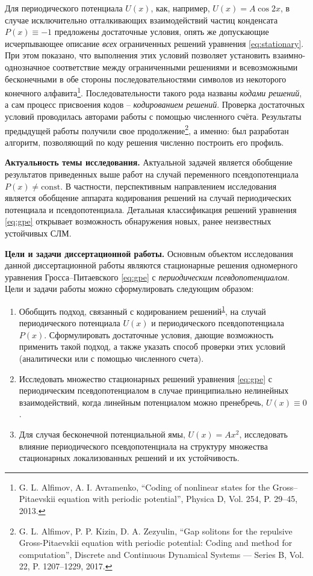 \documentclass[candidate, href, colorlinks]{disser}
\begin{document}
Для периодического потенциала $U(x)$, как, например, $U(x) = A \cos 2x$, в случае исключительно отталкивающих взаимодействий частиц конденсата $P(x) \equiv -1$ предложены достаточные условия, опять же допускающие исчерпывающее описание {\it всех} ограниченных решений уравнения \eqref{eq:stationary}.
При этом показано, что выполнения этих условий позволяет установить взаимно-однозначное соответствие между ограниченными решениями и всевозможными бесконечными в обе стороны последовательностями символов из некоторого конечного алфавита\footnote{\label{note:alfavr} G. L. Alfimov, A. I. Avramenko, ``Coding of nonlinear states for the Gross--Pitaevskii equation with periodic potential'', Physica D, Vol. 254, P. 29--45, 2013.}.
Последовательности такого рода названы {\it кодами решений}, а сам процесс присвоения кодов -- {\it кодированием решений}.
Проверка достаточных условий проводилась авторами работы с помощью численного счёта.
Результаты предыдущей работы получили свое продолжение\footnote{G. L. Alfimov, P. P. Kizin, D. A. Zezyulin, ``Gap solitons for the repulsive Gross-Pitaevskii equation with periodic potential: Coding and method for computation'', Discrete and Continuous Dynamical Systems --- Series B, Vol. 22, P. 1207--1229, 2017.}, а именно: был разработан алгоритм, позволяющий по коду решения численно построить его профиль.

\textbf{Актуальность темы исследования.}
Актуальной задачей является обобщение результатов приведенных выше работ на случай переменного псевдопотенциала $P(x) \neq \mathrm{const}$.
В частности, перспективным направлением исследования является обобщение аппарата кодирования решений на случай периодических потенциала и псевдопотенциала.
Детальная классификация решений уравнения \eqref{eq:gpe} открывает возможность обнаружения новых, ранее неизвестных устойчивых СЛМ.

\textbf{Цели и задачи диссертационной работы.}
Основным объектом исследования данной диссертационной работы являются стационарные решения одномерного уравнения Гросса--Питаевского \eqref{eq:gpe} с {\it периодическим псевдопотенциалом}.
Цели и задачи работы можно сформулировать следующим образом:
\begin{enumerate}
	\item Обобщить подход, связанный с кодированием решений\textsuperscript{\ref{note:alfavr}}, на случай периодического потенциала $U(x)$ и периодического псевдопотенциала $P(x)$.
		Сформулировать достаточные условия, дающие возможность применить такой подход, а также указать способ проверки этих условий (аналитически или с помощью численного счета).
	\item Исследовать множество стационарных решений уравнения \eqref{eq:gpe} с периодическим псевдопотенциалом в случае принципиально нелинейных взаимодействий, когда линейным потенциалом можно пренебречь, $U(x) \equiv 0$.
	\item Для случая бесконечной потенциальной ямы, $U(x) = A x^2$, исследовать влияние периодического псевдопотенциала на структуру множества стационарных локализованных решений и их устойчивость.
\end{enumerate}
\end{document}
